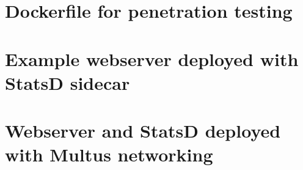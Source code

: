 \documentclass[english, 12pt, a4paper, sci, utf8, a-2b, online]{aaltothesis}
\begin{document}
\thesisappendix

\section{Dockerfile for penetration testing} \label{app:malicious-sidecar}



\clearpage

\section{Example webserver deployed with StatsD sidecar} \label{app:node-webapp}



\clearpage





\clearpage

\section{Webserver and StatsD deployed with Multus networking} \label{app:multus-sidecar}



\clearpage



\clearpage


\end{document}
